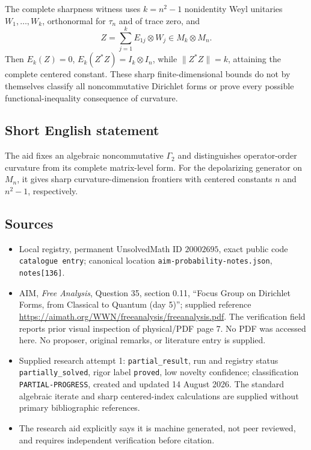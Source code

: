 \documentclass[11pt]{article}
\begin{document}
The complete sharpness witness uses \(k=n^2-1\) nonidentity Weyl unitaries \(W_1,\ldots,W_k\), orthonormal for \(\tau_n\) and of trace zero, and
\[
 Z=\sum_{j=1}^kE_{1j}\otimes W_j\in M_k\otimes M_n.
\]
Then \(E_k(Z)=0\), \(E_k(Z^*Z)=I_k\otimes I_n\), while \(\|Z^*Z\|=k\), attaining the complete centered constant. These sharp finite-dimensional bounds do not by themselves classify all noncommutative Dirichlet forms or prove every possible functional-inequality consequence of curvature.
\subsection{Short English statement}
The aid fixes an algebraic noncommutative \(\Gamma_2\) and distinguishes operator-order curvature from its complete matrix-level form. For the depolarizing generator on \(M_n\), it gives sharp curvature-dimension frontiers with centered constants \(n\) and \(n^2-1\), respectively.
\subsection{Sources}
\begin{itemize}
\item Local registry, permanent UnsolvedMath ID \(20002695\), exact public code \texttt{catalogue entry}; canonical location \texttt{aim-probability-notes.json}, \texttt{notes[136]}.
\item AIM, \emph{Free Analysis}, Question 35, section 0.11, ``Focus Group on Dirichlet Forms, from Classical to Quantum (day 5)''; supplied reference \url{https://aimath.org/WWN/freeanalysis/freeanalysis.pdf}. The verification field reports prior visual inspection of physical/PDF page 7. No PDF was accessed here. No proposer, original remarks, or literature entry is supplied.
\item Supplied research attempt 1: \texttt{partial\_result}, run and registry status \texttt{partially\_solved}, rigor label \texttt{proved}, low novelty confidence; classification \texttt{PARTIAL-PROGRESS}, created and updated 14 August 2026. The standard algebraic iterate and sharp centered-index calculations are supplied without primary bibliographic references.
\item The research aid explicitly says it is machine generated, not peer reviewed, and requires independent verification before citation.
\end{itemize}
\end{document}
